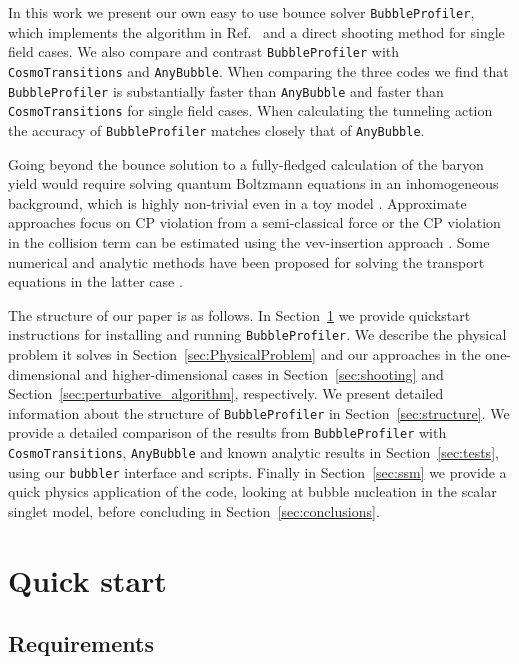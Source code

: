 \documentclass[final,3p,11pt,pdflatex]{elsarticle}
\makeatletter
\newcommand{\ab}{\texttt{AnyBubble}\@\xspace}
\newcommand{\bp}{\texttt{BubbleProfiler}\@\xspace}
\newcommand{\code}[1]{\ifmmode\text{\nolinkurl{#1}}\else\nolinkurl{#1}\fi}
\newcommand{\cosmo}{\texttt{CosmoTransitions}\@\xspace}
\newcommand{\secref}[1]{Section~\ref{#1}}
\newcommand{\refcite}[1]{Ref.~\cite{#1}}
\makeatother
\begin{document}
In this work we present our own easy to use
bounce solver \bp, which implements the algorithm in
\refcite{Akula:2016gpl} and a direct shooting method for single field
cases. We also compare and contrast \bp with \cosmo and \ab.  When
comparing the three codes we find that \bp is substantially faster
than \ab and faster than \cosmo for single field cases.  When
calculating the tunneling action the accuracy of \bp matches closely
that of \ab.

Going beyond the bounce solution to a fully-fledged calculation of the baryon
yield would require solving quantum Boltzmann equations in an inhomogeneous background, which is
highly non-trivial even in a toy model \cite{Cirigliano:2009yt,
  Cirigliano:2011di}. Approximate approaches focus on CP violation from a
semi-classical force \cite{Kainulainen:2001cn} or the CP violation in the
collision term can be estimated using the vev-insertion approach
\cite{Lee:2004we}. Some numerical and analytic methods have been proposed for
solving the transport equations in the latter case \cite{Chung:2009qs,
  White:2015bva}.


The structure of our paper is as follows. In \secref{sec:QuickStart}
we provide quickstart instructions for installing and running \bp.  We
describe the physical problem it solves in
\secref{sec:PhysicalProblem} and our approaches in the one-dimensional
and higher-dimensional cases in \secref{sec:shooting} and
\secref{sec:perturbative_algorithm}, respectively.  We present
detailed information about the structure of \bp in
\secref{sec:structure}.  We provide a detailed comparison of the
results from \bp with \cosmo, \ab and known analytic results in
\secref{sec:tests}, using our \code{bubbler} interface and scripts.
Finally in \secref{sec:ssm} we provide a quick physics application of
the code, looking at bubble nucleation in the scalar singlet model,
before concluding in \secref{sec:conclusions}.

\section{Quick start}
\label{sec:QuickStart}

\subsection{Requirements}
\end{document}
